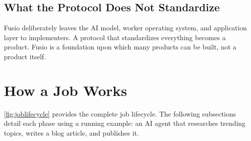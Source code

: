 \documentclass[10pt,twocolumn]{article}
\begin{document}
\subsection{What the Protocol Does Not Standardize}

Fusio deliberately leaves the AI model, worker operating system, and application layer to implementers. A protocol that standardizes everything becomes a product. Fusio is a foundation upon which many products can be built, not a product itself.

\section{How a Job Works}
\label{sec:job}

\cref{fig:joblifecycle} provides the complete job lifecycle. The following subsections detail each phase using a running example: an AI agent that researches trending topics, writes a blog article, and publishes it.
\end{document}
